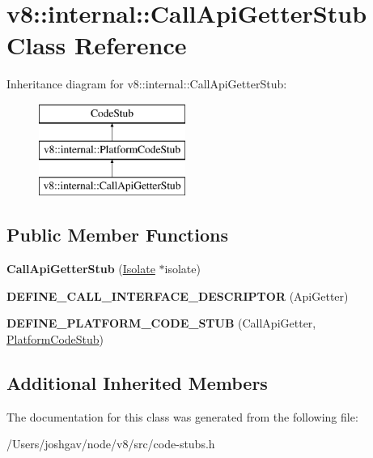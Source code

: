 \hypertarget{classv8_1_1internal_1_1_call_api_getter_stub}{}\section{v8\+:\+:internal\+:\+:Call\+Api\+Getter\+Stub Class Reference}
\label{classv8_1_1internal_1_1_call_api_getter_stub}
Inheritance diagram for v8\+:\+:internal\+:\+:Call\+Api\+Getter\+Stub\+:\begin{figure}[H]
\begin{center}
\leavevmode
\includegraphics[height=3.000000cm]{classv8_1_1internal_1_1_call_api_getter_stub}
\end{center}
\end{figure}
\subsection*{Public Member Functions}
\begin{DoxyCompactItemize}
\item 
{\bfseries Call\+Api\+Getter\+Stub} (\hyperlink{classv8_1_1internal_1_1_isolate}{Isolate} $\ast$isolate)\hypertarget{classv8_1_1internal_1_1_call_api_getter_stub_aed59e1641ccf8d40b949d0193542d638}{}\label{classv8_1_1internal_1_1_call_api_getter_stub_aed59e1641ccf8d40b949d0193542d638}

\item 
{\bfseries D\+E\+F\+I\+N\+E\+\_\+\+C\+A\+L\+L\+\_\+\+I\+N\+T\+E\+R\+F\+A\+C\+E\+\_\+\+D\+E\+S\+C\+R\+I\+P\+T\+OR} (Api\+Getter)\hypertarget{classv8_1_1internal_1_1_call_api_getter_stub_aa703aa41060883b70aec731880680ea1}{}\label{classv8_1_1internal_1_1_call_api_getter_stub_aa703aa41060883b70aec731880680ea1}

\item 
{\bfseries D\+E\+F\+I\+N\+E\+\_\+\+P\+L\+A\+T\+F\+O\+R\+M\+\_\+\+C\+O\+D\+E\+\_\+\+S\+T\+UB} (Call\+Api\+Getter, \hyperlink{classv8_1_1internal_1_1_platform_code_stub}{Platform\+Code\+Stub})\hypertarget{classv8_1_1internal_1_1_call_api_getter_stub_a3bc67eb18c9cc8f62c5b9b69def4a595}{}\label{classv8_1_1internal_1_1_call_api_getter_stub_a3bc67eb18c9cc8f62c5b9b69def4a595}

\end{DoxyCompactItemize}
\subsection*{Additional Inherited Members}


The documentation for this class was generated from the following file\+:\begin{DoxyCompactItemize}
\item 
/\+Users/joshgav/node/v8/src/code-\/stubs.\+h\end{DoxyCompactItemize}
